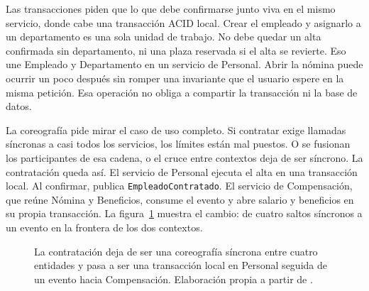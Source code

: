 Las transacciones piden que lo que debe confirmarse junto viva en el mismo servicio, donde cabe una transacción ACID local. Crear el empleado y asignarlo a un departamento es una sola unidad de trabajo. No debe quedar un alta confirmada sin departamento, ni una plaza reservada si el alta se revierte. Eso une Empleado y Departamento en un servicio de Personal. Abrir la nómina puede ocurrir un poco después sin romper una invariante que el usuario espere en la misma petición. Esa operación no obliga a compartir la transacción ni la base de datos.

La coreografía pide mirar el caso de uso completo. Si contratar exige llamadas síncronas a casi todos los servicios, los límites están mal puestos. O se fusionan los participantes de esa cadena, o el cruce entre contextos deja de ser síncrono. La contratación queda así. El servicio de Personal ejecuta el alta en una transacción local. Al confirmar, publica \texttt{EmpleadoContratado}. El servicio de Compensación, que reúne Nómina y Beneficios, consume el evento y abre salario y beneficios en su propia transacción. La figura~\ref{fig:granularidad-rrhh} muestra el cambio: de cuatro saltos síncronos a un evento en la frontera de los dos contextos.

\begin{figure}[H]
  \centering
  \caption{La contratación deja de ser una coreografía síncrona entre cuatro entidades y pasa a ser una transacción local en Personal seguida de un evento hacia Compensación. Elaboración propia a partir de \parencite{richards2020fundamentals}.}
  \label{fig:granularidad-rrhh}
\end{figure}

